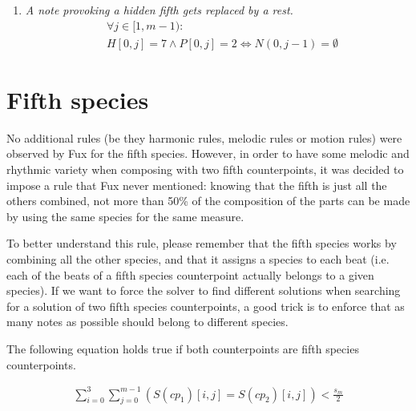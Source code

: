 \begin{enumerate}[wide, label=\bfseries 4.P\arabic*]
    \item \textit{A note provoking a hidden fifth gets replaced by a rest.} \label{constraint:hidden-fifths}
    \begin{equation}
        \begin{aligned}
            &\forall j \in [1, m-1):\\
            &H[0, j] = 7 \land P[0,j] = 2 \iff N(0, j-1) = \emptyset  
        \end{aligned}
    \end{equation}


\end{enumerate}

\section{Fifth species}
No additional rules (be they harmonic rules, melodic rules or motion rules) were observed by Fux for the fifth species.
However, in order to have some melodic and rhythmic variety when composing with two fifth counterpoints, it was decided to impose a rule that Fux never mentioned: knowing that the fifth is just all the others combined, not more than 50\% of the composition of the parts can be made by using the same species for the same measure.


To better understand this rule, please remember that the fifth species works by combining all the other species, and that it assigns a species to each beat (i.e. each of the beats of a fifth species counterpoint actually belongs to a given species). If we want to force the solver to find different solutions when searching for a solution of two fifth species counterpoints, a good trick is to enforce that as many notes as possible should belong to different species.

The following equation holds true if both counterpoints are fifth species counterpoints.

\begin{equation}
\begin{aligned}
\sum_{i=0}^{3} \sum_{j=0}^{m-1} (S(cp_1)[i,j] = S(cp_2)[i,j]) < \frac{s_m}{2}
\end{aligned}
\end{equation}
